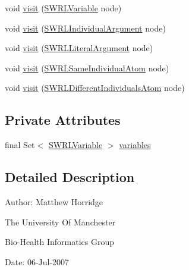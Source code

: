 \begin{DoxyCompactItemize}
\item 
void \hyperlink{classorg_1_1semanticweb_1_1owlapi_1_1util_1_1_s_w_r_l_variable_extractor_a4aec9748dc10aa0330948acfdf502f57}{visit} (\hyperlink{interfaceorg_1_1semanticweb_1_1owlapi_1_1model_1_1_s_w_r_l_variable}{S\-W\-R\-L\-Variable} node)
\item 
void \hyperlink{classorg_1_1semanticweb_1_1owlapi_1_1util_1_1_s_w_r_l_variable_extractor_ab49b2b3d2c5150ffc8c683d94fe409f7}{visit} (\hyperlink{interfaceorg_1_1semanticweb_1_1owlapi_1_1model_1_1_s_w_r_l_individual_argument}{S\-W\-R\-L\-Individual\-Argument} node)
\item 
void \hyperlink{classorg_1_1semanticweb_1_1owlapi_1_1util_1_1_s_w_r_l_variable_extractor_a42cf652cd75d373876d73b296a5df68c}{visit} (\hyperlink{interfaceorg_1_1semanticweb_1_1owlapi_1_1model_1_1_s_w_r_l_literal_argument}{S\-W\-R\-L\-Literal\-Argument} node)
\item 
void \hyperlink{classorg_1_1semanticweb_1_1owlapi_1_1util_1_1_s_w_r_l_variable_extractor_a9423ee855d9707a261234dc1c65ac06e}{visit} (\hyperlink{interfaceorg_1_1semanticweb_1_1owlapi_1_1model_1_1_s_w_r_l_same_individual_atom}{S\-W\-R\-L\-Same\-Individual\-Atom} node)
\item 
void \hyperlink{classorg_1_1semanticweb_1_1owlapi_1_1util_1_1_s_w_r_l_variable_extractor_a55f4abf1d79ee13fae78ec01793cfff9}{visit} (\hyperlink{interfaceorg_1_1semanticweb_1_1owlapi_1_1model_1_1_s_w_r_l_different_individuals_atom}{S\-W\-R\-L\-Different\-Individuals\-Atom} node)
\end{DoxyCompactItemize}
\subsection*{Private Attributes}
\begin{DoxyCompactItemize}
\item 
final Set$<$ \hyperlink{interfaceorg_1_1semanticweb_1_1owlapi_1_1model_1_1_s_w_r_l_variable}{S\-W\-R\-L\-Variable} $>$ \hyperlink{classorg_1_1semanticweb_1_1owlapi_1_1util_1_1_s_w_r_l_variable_extractor_aeb13fe2477f565b9562ed5fa55b18dc5}{variables}
\end{DoxyCompactItemize}


\subsection{Detailed Description}
Author\-: Matthew Horridge\par
 The University Of Manchester\par
 Bio-\/\-Health Informatics Group\par
 Date\-: 06-\/\-Jul-\/2007\par
\par


